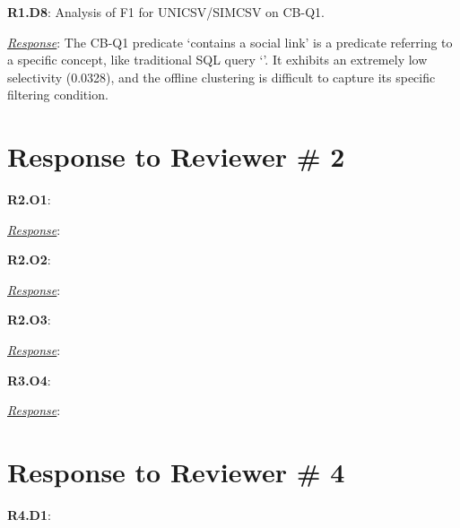 \documentclass[sigconf]{acmart}
\begin{document}
{\noindent \textbf{{R1.D8}}}: Analysis of F1 for UNICSV/SIMCSV on CB-Q1. 



{\noindent \underline{\sl Response}:}
 The CB-Q1 predicate `contains a social link' is a predicate referring to a specific concept, like traditional SQL query `'. It exhibits an extremely low selectivity (0.0328), and the offline clustering is difficult to capture its specific filtering condition.


\vspace{-2mm}
\section*{Response to Reviewer \# 2}
{\noindent \textbf{R2.O1}}: 

{\noindent \underline{\sl Response}:}


{\noindent \textbf{R2.O2}}: 

{\noindent \underline{\sl Response}:}


{\noindent \textbf{R2.O3}}: 

{\noindent \underline{\sl Response}:}



{\noindent \textbf{R3.O4}}: 

{\noindent \underline{\sl Response}:}



\vspace{-2mm}
\section*{Response to Reviewer \# 4}
{\noindent \textbf{R4.D1}}: 
\end{document}
